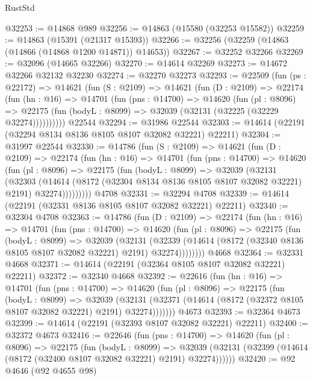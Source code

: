 \begin{lexlean}{RustStd}
\begin{coremodule}
@32253 := @14868 @989
@32256 := @14863 (@15580 (@32253 @15582))
@32259 := @14863 (@15391 (@21317 @15393))
@32266 := @32256 (@32259 (@14863 (@14866 (@14868 @1200 @14871)) @14653))
@32267 := @32252 @32266
@32269 := @32096 (@14665 @32266)
@32270 := @14614 @32269
@32273 := @14672 @32266 @32132 @32230
@32274 := @32270 @32273
@32293 := @22509
    (fun (ps : @22172) =>
    @14621
      (fun (S : @2109) =>
      @14621
        (fun (D : @2109) =>
        @22174
          (fun (hn : @16) =>
          @14701
            (fun (pns : @14700) =>
            @14620
              (fun (pl : @8096) =>
              @22175 (fun (bodyL : @8099) => @32039 (@32131 (@32225 (@32229 @32274))))))))))
    @22544
@32294 := @31986 @22544
@32303 := @14614 (@22191 (@32294 @8134 @8136 @8105 @8107 @32082 @32221) @22211)
@32304 := @31997 @22544
@32330 := @14786
    (fun (S : @2109) =>
    @14621
      (fun (D : @2109) =>
      @22174
        (fun (hn : @16) =>
        @14701
          (fun (pns : @14700) =>
          @14620
            (fun (pl : @8096) =>
            @22175
              (fun (bodyL : @8099) =>
              @32039
                (@32131
                  (@32303
                    (@14614
                      (@8172 (@32304 @8134 @8136 @8105 @8107 @32082 @32221) @2191)
                      @32274)))))))))
    @4708
@32331 := @32294 @4708
@32339 := @14614 (@22191 (@32331 @8136 @8105 @8107 @32082 @32221) @22211)
@32340 := @32304 @4708
@32363 := @14786
    (fun (D : @2109) =>
    @22174
      (fun (hn : @16) =>
      @14701
        (fun (pns : @14700) =>
        @14620
          (fun (pl : @8096) =>
          @22175
            (fun (bodyL : @8099) =>
            @32039
              (@32131
                (@32339
                  (@14614 (@8172 (@32340 @8136 @8105 @8107 @32082 @32221) @2191) @32274))))))))
    @4668
@32364 := @32331 @4668
@32371 := @14614 (@22191 (@32364 @8105 @8107 @32082 @32221) @22211)
@32372 := @32340 @4668
@32392 := @22616
    (fun (hn : @16) =>
    @14701
      (fun (pns : @14700) =>
      @14620
        (fun (pl : @8096) =>
        @22175
          (fun (bodyL : @8099) =>
          @32039
            (@32131 (@32371 (@14614 (@8172 (@32372 @8105 @8107 @32082 @32221) @2191) @32274)))))))
    @4673
@32393 := @32364 @4673
@32399 := @14614 (@22191 (@32393 @8107 @32082 @32221) @22211)
@32400 := @32372 @4673
@32416 := @22646
    (fun (pns : @14700) =>
    @14620
      (fun (pl : @8096) =>
      @22175
        (fun (bodyL : @8099) =>
        @32039 (@32131 (@32399 (@14614 (@8172 (@32400 @8107 @32082 @32221) @2191) @32274))))))
@32420 := @92 @4646 (@92 @4655 @98)

\end{coremodule}
\end{lexlean}
